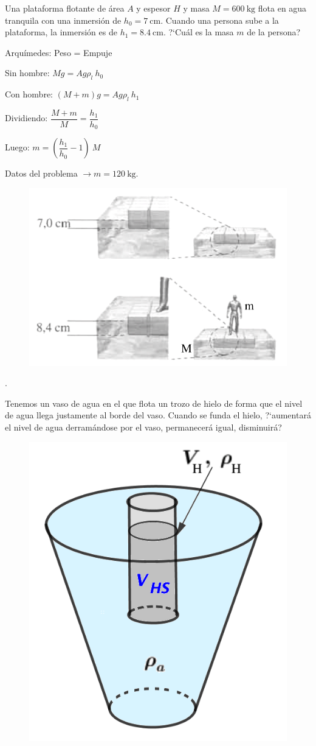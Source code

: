 \begin{prob}
	Una plataforma flotante de área $A$ y espesor $H$ y masa $M=600\ \mathrm{kg}$ flota en agua tranquila con una inmersión de $h_0=7\ \mathrm{cm}$. Cuando una persona sube a la plataforma, la inmersión es de $h_1=8.4\ \mathrm{cm}$. ?`Cuál es la masa $m$ de la persona?
\end{prob}

\begin{multicols}{2}
Arquímedes: Peso = Empuje

Sin hombre: $Mg=Ag \rho_l \ h_0$

Con hombre: $(M+m)g=Ag \rho_l \ h_1$

Dividiendo: $\dfrac {M+m}{M}=\dfrac {h_1}{h_0}$

Luego: $m=\left( \dfrac{h_1}{h_0}-1 \right)\ M$

Datos del problema $\to m=120\ \mathrm{kg}$.
\begin{figure}[H]
	\centering
	\includegraphics[width=.55\textwidth]{imagenes/imagenes07/T07IM20.png}
\end{figure}	
\end{multicols}
\begin{prob}
\begin{multicols}{2}.

Tenemos un vaso de agua en el que flota un trozo de hielo de forma que el nivel de agua llega justamente al borde del vaso. Cuando se funda el hielo, ?`aumentará el nivel de agua derramándose por el vaso, permanecerá igual, disminuirá?	
\begin{figure}[H]
	\centering
	\includegraphics[width=.3\textwidth]{imagenes/imagenes07/T07IM21.png}
\end{figure}
\end{multicols}
\end{prob}

